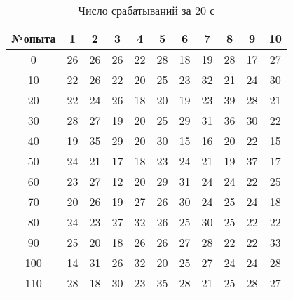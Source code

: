\documentclass[a4paper]{article}
\begin{document}
        \begin{table}[h!]
\centering
\large
\caption{Число срабатываний за 20 с}
\begin{tabular}{|c|*{10}{c|}}
\hline
\textbf{№опыта} & \textbf{1} & \textbf{2} & \textbf{3} & \textbf{4} & \textbf{5} & \textbf{6} & \textbf{7} & \textbf{8} & \textbf{9} & \textbf{10} \\
\hline
0               & 26         & 26         & 26         & 22         & 28         & 18         & 19         & 28         & 17         & 27          \\
\hline
10              & 22         & 26         & 22         & 20         & 25         & 23         & 32         & 21         & 24         & 30          \\
\hline
20              & 22         & 24         & 26         & 18         & 20         & 19         & 23         & 39         & 28         & 21          \\
\hline
30              & 28         & 27         & 19         & 20         & 25         & 29         & 31         & 36         & 30         & 22          \\
\hline
40              & 19         & 35         & 29         & 20         & 30         & 15         & 16         & 20         & 22         & 15          \\
\hline
50              & 24         & 21         & 17         & 18         & 23         & 24         & 21         & 19         & 37         & 17          \\
\hline
60              & 23         & 27         & 12         & 20         & 29         & 31         & 24         & 24         & 22         & 25          \\
\hline
70              & 20         & 26         & 19         & 27         & 26         & 30         & 24         & 25         & 24         & 18          \\
\hline
80              & 24         & 23         & 27         & 32         & 26         & 25         & 30         & 25         & 22         & 22          \\
\hline
90              & 25         & 20         & 18         & 26         & 26         & 27         & 28         & 22         & 22         & 33          \\
\hline
100             & 14         & 31         & 26         & 32         & 20         & 25         & 27         & 24         & 24         & 28          \\
\hline
110             & 28         & 18         & 30         & 23         & 35         & 28         & 21         & 25         & 28         & 27          \\

\end{tabular}
\end{table}
\end{document}
